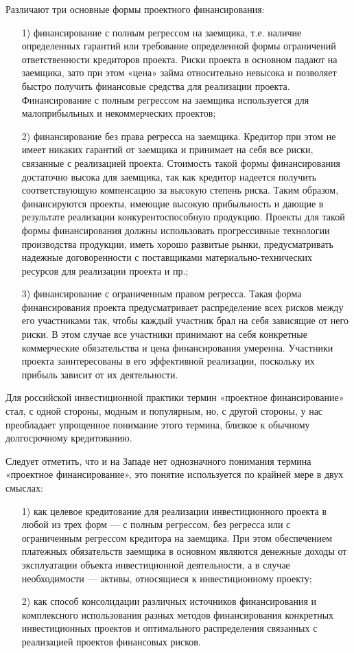 Различают три основные формы проектного финансирования:
\begin{enumerate}
	\item [1)] финансирование с полным регрессом на заемщика, т.е. наличие определенных гарантий или требование определенной формы ограничений ответственности кредиторов проекта. Риски проекта в основном падают на заемщика, зато при этом «цена» займа относительно невысока и позволяет быстро получить финансовые средства для реализации проекта. Финансирование с полным регрессом на заемщика используется для малоприбыльных и некоммерческих проектов;
	\item [2)] финансирование без права регресса на заемщика. Кредитор при этом не имеет никаких гарантий от заемщика и принимает на себя все риски, связанные с реализацией проекта. Стоимость такой формы финансирования достаточно высока для заемщика, так как кредитор надеется получить соответствующую компенсацию за высокую степень риска. Таким образом, финансируются проекты, имеющие высокую прибыльность и дающие в результате реализации конкурентоспособную продукцию. Проекты для такой формы финансирования должны использовать прогрессивные технологии производства продукции, иметь хорошо развитые рынки, предусматривать надежные договоренности с поставщиками материально-технических ресурсов для реализации проекта и пр.;
	\item [3)] финансирование с ограниченным правом регресса. Такая форма финансирования проекта предусматривает распределение всех рисков между его участниками так, чтобы каждый участник брал на себя зависящие от него риски. В этом случае все участники принимают на себя конкретные коммерческие обязательства и цена финансирования умеренна. Участники проекта заинтересованы в его эффективной реализации, поскольку их прибыль зависит от их деятельности.
\end{enumerate}

Для российской инвестиционной практики термин «проектное финансирование» стал, с одной стороны, модным и популярным, но, с другой стороны, у нас преобладает упрощенное понимание этого термина, близкое к обычному долгосрочному кредитованию.

Следует отметить, что и на Западе нет однозначного понимания термина «проектное финансирование», это понятие используется по крайней мере в двух смыслах:
\begin{enumerate}
	\item [1)] как целевое кредитование для реализации инвестиционного проекта в любой из трех форм --- с полным регрессом, без регресса или с ограниченным регрессом кредитора на заемщика. При этом обеспечением платежных обязательств заемщика в основном являются денежные доходы от эксплуатации объекта инвестиционной деятельности, а в случае необходимости --- активы, относящиеся к инвестиционному проекту;
	\item [2)] как способ консолидации различных источников финансирования и комплексного использования разных методов финансирования конкретных инвестиционных проектов и оптимального распределения связанных с реализацией проектов финансовых рисков.
\end{enumerate}

